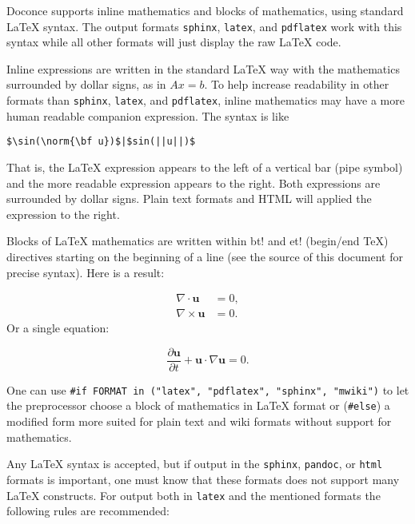 \documentclass[%
oneside,                 %
final,                   %
10pt]{article}
\begin{document}
Doconce supports inline mathematics and blocks of mathematics, using
standard {\LaTeX} syntax. The output formats \Verb!sphinx!, \Verb!latex!, and \Verb!pdflatex!
work with this syntax while all other formats will just display the
raw {\LaTeX} code.

Inline expressions are written in the standard
{\LaTeX} way with the mathematics surrounded by dollar signs, as in
$Ax=b$. To help increase readability in other formats than \Verb!sphinx!,
\Verb!latex!, and \Verb!pdflatex!, inline mathematics may have a more human
readable companion expression. The syntax is like
\begin{Verbatim}[numbers=none,fontsize=\fontsize{9pt}{9pt},baselinestretch=0.85,xleftmargin=0mm]
$\sin(\norm{\bf u})$|$sin(||u||)$
\end{Verbatim}
That is, the {\LaTeX} expression appears to the left of a vertical bar (pipe
symbol) and the more readable expression appears to the right. Both
expressions are surrounded by dollar signs. Plain text formats and HTML
will applied the expression to the right.

Blocks of {\LaTeX} mathematics are written within
\Verb!!bt!
and
\Verb!!et! (begin/end TeX) directives starting on the beginning of a line
(see the source of this document for precise syntax).
Here is a result:

\begin{align*}
\nabla\cdot \pmb{u} &= 0,\\
\nabla\times \pmb{u} &= 0.
\end{align*}
Or a single equation:

\[ \frac{\partial\pmb{u}}{\partial t} + \pmb{u}\cdot\nabla\pmb{u} = 0.\]

One can use \Verb!#if FORMAT in ("latex", "pdflatex", "sphinx", "mwiki")! to let
the preprocessor choose a block of mathematics in {\LaTeX} format
or (\Verb!#else!) a modified form more suited for plain text and wiki
formats without support for mathematics.

Any {\LaTeX} syntax is accepted, but if output in the \Verb!sphinx!, \Verb!pandoc!,
or \Verb!html! formats
is important, one must know that these formats does not support many
{\LaTeX} constructs. For output both in \Verb!latex! and the mentioned formats
the following rules are recommended:
\end{document}
